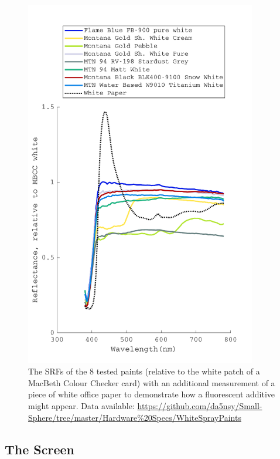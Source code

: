 \begin{figure}[htbp]
\includegraphics[max width=0.9\textwidth,center]{figs/SmallSphere/VisualiseSPDs_result.pdf}
\caption{The \glspl{SRF} of the 8 tested paints (relative to the white patch of a MacBeth Colour Checker card) with an additional measurement of a piece of white office paper to demonstrate how a fluorescent additive might appear. Data available: \url{https://github.com/da5nsy/Small-Sphere/tree/master/Hardware\%20Specs/WhiteSprayPaints}}
\label{fig:spray}
\end{figure}


\subsection{The Screen}

